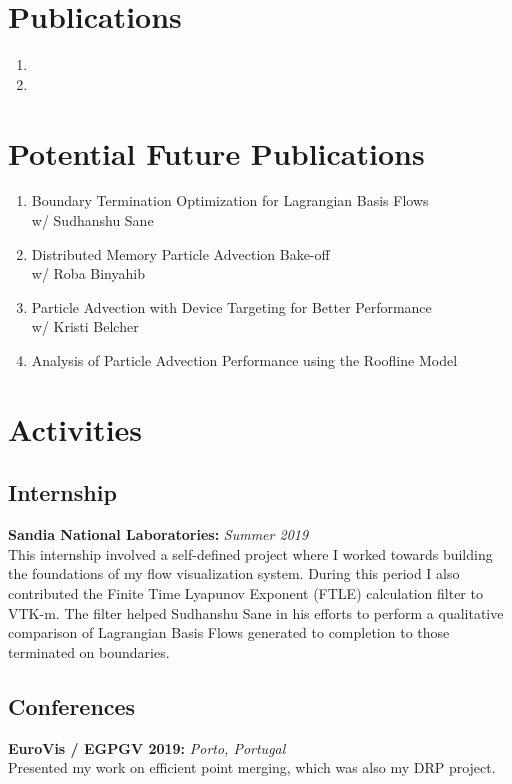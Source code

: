 \documentclass[12pt,letter]{article}
\begin{document}
%


\section{Publications}
\begin{enumerate}
 \item {}
 \item {}
\end{enumerate}

\section{Potential Future Publications}
\begin{enumerate}
  \item Boundary Termination Optimization for Lagrangian Basis Flows
  \\w/ Sudhanshu Sane
  \item Distributed Memory Particle Advection Bake-off
  \\w/ Roba Binyahib
  \item Particle Advection with Device Targeting for Better Performance
  \\w/ Kristi Belcher
  \item Analysis of Particle Advection Performance using the Roofline Model
\end{enumerate}

\section{Activities}

\subsection*{Internship}
\noindent \textbf{Sandia National Laboratories:} \textit{Summer 2019}
\\
This internship involved a self-defined project where I worked towards building
the foundations of my flow visualization system.
%
During this period I also contributed the Finite Time Lyapunov Exponent (FTLE) calculation
filter to VTK-m. 
%
The filter helped Sudhanshu Sane in his efforts to perform a qualitative comparison
of Lagrangian Basis Flows generated to completion to those terminated on boundaries.

\subsection*{Conferences}
\noindent \textbf{EuroVis / EGPGV 2019:} \textit{Porto, Portugal}
\\
Presented my work on efficient point merging, which was also my DRP project. 
\end{document}
